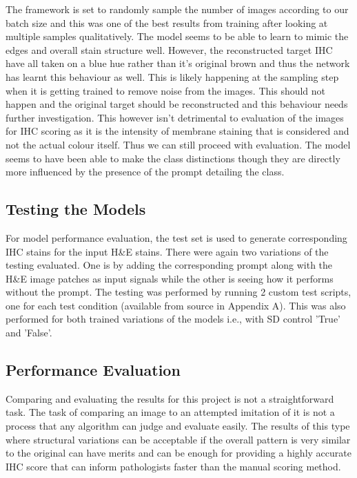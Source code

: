 The framework is set to randomly sample the number of images according to our batch size and this was one of the best results from training after looking at multiple samples qualitatively. The model seems to be able to learn to mimic the edges and overall stain structure well. However, the reconstructed target IHC have all taken on a blue hue rather than it's original brown and thus the network has learnt this behaviour as well. This is likely happening at the sampling step when it is getting trained to remove noise from the images. This should not happen and the original target should be reconstructed and this behaviour needs further investigation. This however isn't detrimental to evaluation of the images for IHC scoring as it is the intensity of membrane staining that is considered and not the actual colour itself. Thus we can still proceed with evaluation. The model seems to have been able to make the class distinctions though they are directly more influenced by the presence of the prompt detailing the class.

\subsection{Testing the Models}

For model performance evaluation, the test set is used to generate corresponding IHC stains for the input H\&E stains. There were again two variations of the testing evaluated. One is by adding the corresponding prompt along with the H\&E image patches as input signals while the other is seeing how it performs without the prompt. The testing was performed by running 2 custom test scripts, one for each test condition (available from source in Appendix A). This was also performed for both trained variations of the models i.e., with SD control 'True' and 'False'.

\subsection{Performance Evaluation}

Comparing and evaluating the results for this project is not a straightforward task. The task of comparing an image to an attempted imitation of it is not a process that any algorithm can judge and evaluate easily. The results of this type where structural variations can be acceptable if the overall pattern is very similar to the original can have merits and can be enough for providing a highly accurate IHC score that can inform pathologists faster than the manual scoring method. 

